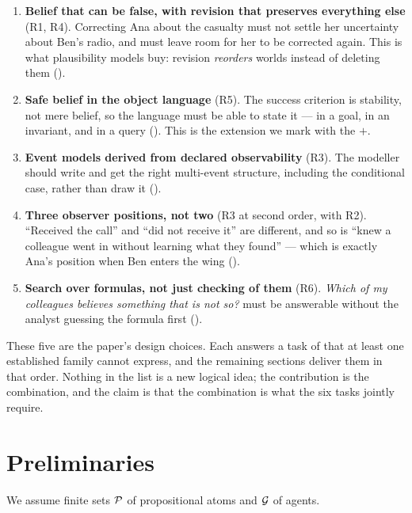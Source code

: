 \documentclass[11pt,a4paper]{article}
\begin{document}
\begin{enumerate}
  \item \textbf{Belief that can be false, with revision that preserves everything else} (R1, R4).
    Correcting Ana about the casualty must not settle her uncertainty about Ben's
    radio, and must leave room for her to be corrected again. This is what plausibility
    models buy: revision \emph{reorders} worlds instead of deleting them
    ().

  \item \textbf{Safe belief in the object language} (R5). The success criterion is stability, not
    mere belief, so the language must be able to state it --- in a goal, in an invariant, and
    in a query (). This is the extension we mark with the $+$.

  \item \textbf{Event models derived from declared observability} (R3). The modeller should write
     and get the right multi-event structure, including the
    conditional case, rather than draw it ().

  \item \textbf{Three observer positions, not two} (R3 at second order, with R2). ``Received the call'' and ``did not
    receive it'' are different, and so is ``knew a colleague went in without learning what they
    found'' --- which is exactly Ana's position when Ben enters the wing ().

  \item \textbf{Search over formulas, not just checking of them} (R6). \emph{Which of my colleagues believes
    something that is not so?} must be answerable without the analyst guessing the formula
    first ().
\end{enumerate}

These five are the paper's design choices. Each answers a task of  that at
least one established family cannot express, and the remaining sections deliver them in that
order. Nothing in the list is a new logical idea; the contribution is the combination, and the
claim is that the combination is what the six tasks jointly require.

\section{Preliminaries}
\label{sec:prelim}

We assume finite sets $\mathcal{P}$ of propositional atoms and $\mathcal{G}$ of agents.
\end{document}
